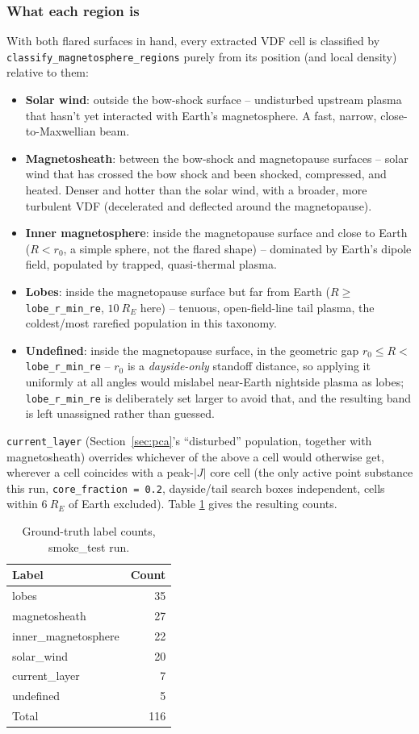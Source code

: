 \documentclass[11pt]{article}
\begin{document}
\subsubsection{What each region is}
With both flared surfaces in hand, every extracted VDF cell is
classified by \texttt{classify\_magnetosphere\_regions} purely from its
position (and local density) relative to them:
\begin{itemize}
  \item \textbf{Solar wind}: outside the bow-shock surface -- undisturbed
  upstream plasma that hasn't yet interacted with Earth's magnetosphere.
  A fast, narrow, close-to-Maxwellian beam.
  \item \textbf{Magnetosheath}: between the bow-shock and magnetopause
  surfaces -- solar wind that has crossed the bow shock and been shocked,
  compressed, and heated. Denser and hotter than the solar wind, with a
  broader, more turbulent VDF (decelerated and deflected around the
  magnetopause).
  \item \textbf{Inner magnetosphere}: inside the magnetopause surface and
  close to Earth ($R < r_0$, a simple sphere, not the flared shape) --
  dominated by Earth's dipole field, populated by trapped, quasi-thermal
  plasma.
  \item \textbf{Lobes}: inside the magnetopause surface but far from Earth
  ($R \geq$ \texttt{lobe\_r\_min\_re}, $10~R_E$ here) -- tenuous,
  open-field-line tail plasma, the coldest/most rarefied population in
  this taxonomy.
  \item \textbf{Undefined}: inside the magnetopause surface, in the
  geometric gap $r_0 \leq R < $ \texttt{lobe\_r\_min\_re} -- $r_0$ is a
  \emph{dayside-only} standoff distance, so applying it uniformly at all
  angles would mislabel near-Earth nightside plasma as lobes;
  \texttt{lobe\_r\_min\_re} is deliberately set larger to avoid that, and
  the resulting band is left unassigned rather than guessed.
\end{itemize}
\texttt{current\_layer} (Section~\ref{sec:pca}'s ``disturbed'' population,
together with magnetosheath) overrides whichever of the above a cell
would otherwise get, wherever a cell coincides with a peak-$|J|$ core
cell (the only active point substance this run,
\texttt{core\_fraction~=~0.2}, dayside/tail search boxes independent,
cells within $6~R_E$ of Earth excluded). Table \ref{tab:label-counts}
gives the resulting counts.

\begin{table}[h]
\centering
\begin{tabular}{lr}
\toprule
Label & Count \\
\midrule
lobes & 35 \\
magnetosheath & 27 \\
inner\_magnetosphere & 22 \\
solar\_wind & 20 \\
current\_layer & 7 \\
undefined & 5 \\
\midrule
Total & 116 \\
\bottomrule
\end{tabular}
\caption{Ground-truth label counts, smoke\_test run.}
\label{tab:label-counts}
\end{table}
\end{document}
